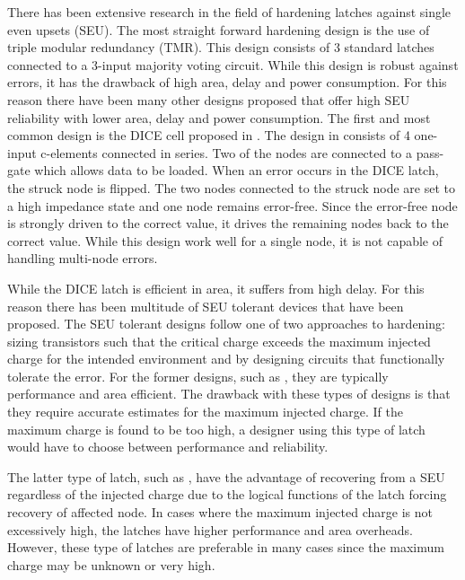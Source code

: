 There has been extensive research in the field of hardening latches against single even upsets (SEU). The most straight forward hardening design is the use of triple modular redundancy (TMR). This design consists of 3 standard latches connected to a 3-input majority voting circuit. While this design is robust against errors, it has the drawback of high area, delay and power consumption. For this reason there have been many other designs proposed that offer high SEU reliability with lower area, delay and power consumption. The first and most common design is the DICE cell proposed in \cite{DICE}. The design in \cite{DICE} consists of 4 one-input c-elements connected in series. Two of the nodes are connected to a pass-gate which allows data to be loaded. When an error occurs in the DICE latch, the struck node is flipped. The two nodes connected to the struck node are set to a high impedance state and one node remains error-free. Since the error-free node is strongly driven to the correct value, it drives the remaining nodes back to the correct value. While this design work well for a single node, it is not capable of handling multi-node errors. 

While the DICE latch is efficient in area, it suffers from high delay. For this reason there has been multitude of SEU tolerant devices that have been proposed. The SEU tolerant designs follow one of two approaches to hardening: sizing transistors such that the critical charge exceeds the maximum injected charge for the intended environment and by designing circuits that functionally tolerate the error. For the former designs, such as \cite{NicoFeedback}, they are typically performance and area efficient. The drawback with these types of designs is that they require accurate estimates for the maximum injected charge. If the maximum charge is found to be too high, a designer using this type of latch would have to choose between performance and reliability. 

The latter type of latch, such as \cite{HIPER, FERST, Hazucha, SEMULatch, Multivdd, BISER}, have the advantage of recovering from a SEU regardless of the injected charge due to the logical functions of the latch forcing recovery of affected node. In cases where the maximum injected charge is not excessively high, the latches have higher performance and area overheads. However, these type of latches are preferable in many cases since the maximum charge may be unknown or very high. 

